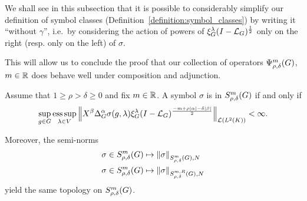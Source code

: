 We shall see in this subsection that it is possible to considerably simplify our definition of symbol classes (Definition~\ref{definition:symbol_classes})
by writing it ``without $\gamma$'',
i.e.\ by considering the action of powers of $\xi^{\lambda}_{G} (I - {\mathcal{L}_{G}})^\frac{1}{2}$
only on the right (resp. only on the left) of $\sigma$.

This will allow us to conclude the proof that our collection of operators $\Psi^{m}_{\rho, \delta}(G)$, $m \in \mathbb{R}$ does behave well under composition and adjunction.

\begin{theorem}
\label{theorem:simplification_of_symbol_classes_definition}
    Assume that $1 \geq \rho > \delta \geq 0$ and fix $m \in \mathbb{R}$.
    A symbol $\sigma$ is in $S^{m}_{\rho, \delta}(G)$ if and only if
    \begin{align*}
        \sup_{g \in \Group} \esssup_{\lambda \in \VectorSpace}
        \norm [\Lin {\Lebesgue 2 \CompactGroup}] {%
            \LeftDifferentialOperator \beta
            \DifferenceOperatorOrder \alpha
            \sigma(g, \lambda)
            \Rep \lambda \BesselPotential {-m + \rho \abs \alpha - \delta \abs \beta}
        } < \infty.
    \end{align*}

    Moreover,
    the semi-norms
    \begin{align*}
        &\sigma \in S^{m}_{\rho, \delta}(G) \mapsto {\left\| \sigma \right\|}_{S^{m}_{\rho, \delta}(G), N}\\
        &\sigma \in S^{m}_{\rho, \delta}(G) \mapsto {\left\| \sigma \right\|}_{S^{m, R}_{\rho, \delta}(G), N}
    \end{align*}
    yield the same topology on $S^{m}_{\rho, \delta}(G)$.
\end{theorem}
